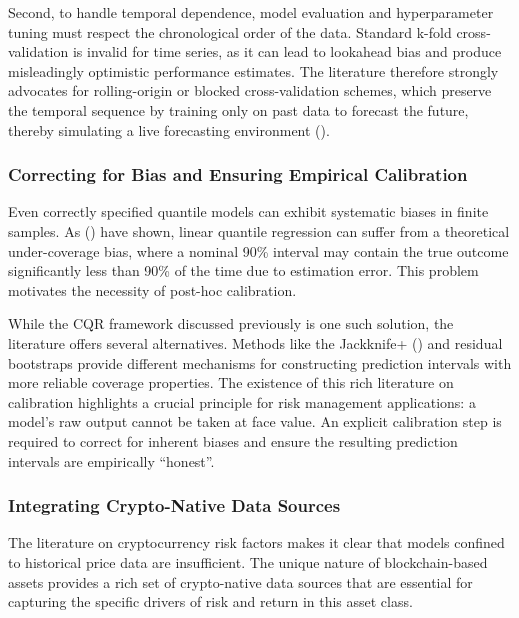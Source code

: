 \documentclass[
  a4paper,
  DIV=11,
  numbers=noendperiod]{scrreprt}
\begin{document}
Second, to handle temporal dependence, model evaluation and
hyperparameter tuning must respect the chronological order of the data.
Standard k-fold cross-validation is invalid for time series, as it can
lead to lookahead bias and produce misleadingly optimistic performance
estimates. The literature therefore strongly advocates for
rolling-origin or blocked cross-validation schemes, which preserve the
temporal sequence by training only on past data to forecast the future,
thereby simulating a live forecasting environment
().

\subsubsection{Correcting for Bias and Ensuring Empirical
Calibration}\label{correcting-for-bias-and-ensuring-empirical-calibration}

Even correctly specified quantile models can exhibit systematic biases
in finite samples. As ()
have shown, linear quantile regression can suffer from a theoretical
under-coverage bias, where a nominal 90\% interval may contain the true
outcome significantly less than 90\% of the time due to estimation
error. This problem motivates the necessity of post-hoc calibration.

While the CQR framework discussed previously is one such solution, the
literature offers several alternatives. Methods like the Jackknife+
() and residual
bootstraps provide different mechanisms for constructing prediction
intervals with more reliable coverage properties. The existence of this
rich literature on calibration highlights a crucial principle for risk
management applications: a model's raw output cannot be taken at face
value. An explicit calibration step is required to correct for inherent
biases and ensure the resulting prediction intervals are empirically
``honest''.

\subsubsection{Integrating Crypto-Native Data
Sources}\label{integrating-crypto-native-data-sources}

The literature on cryptocurrency risk factors makes it clear that models
confined to historical price data are insufficient. The unique nature of
blockchain-based assets provides a rich set of crypto-native data
sources that are essential for capturing the specific drivers of risk
and return in this asset class.
\end{document}

